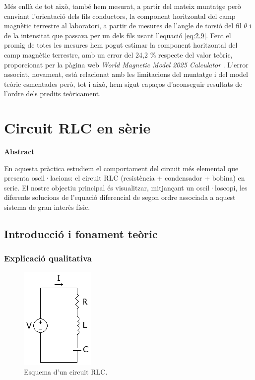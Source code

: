 \documentclass[a4paper,10.5pt]{report}
\newenvironment{chapterabstract}{
	\begin{center}
		\bfseries Abstract
	\end{center}
	\quotation
}{\endquotation}
\begin{document}
Més enllà de tot això, també hem mesurat, a partir del mateix muntatge però canviant l'orientació dels fils conductors, la component horitzontal del camp magnètic terrestre al laboratori, a partir de mesures de l'angle de torsió del fil $\theta$ i de la intensitat que passava per un dels fils usant l'equació \eqref{eq:2.9}. Fent el promig de totes les mesures hem pogut estimar la component horitzontal del camp magnètic terrestre, amb un error del 24,2 \% respecte del valor teòric, proporcionat per la pàgina web \textit{World Magnetic Model 2025 Calculator} \cite{ref2}. L'error associat, novament, està relacionat amb les limitacions del muntatge i del model teòric esmentades però, tot i això, hem sigut capaços d'aconseguir resultats de l'ordre dels predits teòricament.

\chapter{Circuit RLC en sèrie}

\begin{chapterabstract}
	En aquesta pràctica estudiem el comportament del circuit més elemental que presenta oscil·lacions: el circuit RLC (resistència + condensador + bobina) en serie. El nostre objectiu principal és visualitzar, mitjançant un oscil·loscopi, les diferents solucions de l'equació diferencial de segon ordre associada a aquest sistema de gran interès físic.
\end{chapterabstract}

\section{Introducció i fonament teòric}

\subsection{Explicació qualitativa}

\begin{figure}[h]
	\centering
	\includegraphics[width=0.15\linewidth]{screenshot014}
	\caption{Esquema d'un circuit RLC.}
	\label{fig:3.1}
\end{figure}
\end{document}
